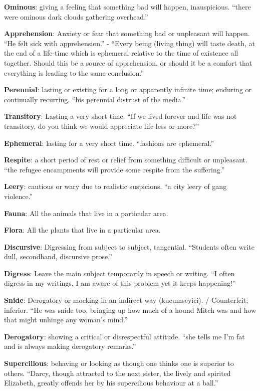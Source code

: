 \documentclass[12pt, a4paper]{ximera}
\begin{document}
\textbf{Ominous}: giving a feeling that something bad will happen, inauspicious. ``there were ominous dark clouds gathering overhead.''

\textbf{Apprehension}: Anxiety or fear that something bad or unpleasant will happen. ``He felt sick with apprehension.'' - ``Every being (living thing) will taste death, at the end of a life-time which is ephemeral relative to the time of existence all together. Should this be a source of apprehension, or should it be a comfort that everything is leading to the same conclusion.''

\textbf{Perennial}: lasting or existing for a long or apparently infinite time; enduring or continually recurring. ``his perennial distrust of the media.''

\textbf{Transitory}: Lasting a very short time. ``If we lived forever and life was not transitory, do you think we would appreciate life less or more?''

\textbf{Ephemeral}: lasting for a very short time. ``fashions are ephemeral.''

\textbf{Respite}: a short period of rest or relief from something difficult or unpleasant. ``the refugee encampments will provide some respite from the suffering.''

\textbf{Leery}: cautious or wary due to realistic suspicions. ``a city leery of gang violence.''

\textbf{Fauna}: All the animals that live in a particular area.

\textbf{Flora}: All the plants that live in a particular area.

\textbf{Discursive}: Digressing from subject to subject, tangential. ``Students often write dull, secondhand, discursive prose.''

\textbf{Digress}: Leave the main subject temporarily in speech or writing. ``I often digress in my writings, I am aware of this problem yet it keeps happening!''

\textbf{Snide}: Derogatory or mocking in an indirect way (kucumseyici). / Counterfeit; inferior. ``He was snide too, bringing up how much of a hound Mitch was and how that might unhinge any woman's mind.''

\textbf{Derogatory}: showing a critical or disrespectful attitude. ``she tells me I'm fat and is always making derogatory remarks.''

\textbf{Supercilious}: behaving or looking as though one thinks one is superior to others. ``Darcy, though attracted to the next sister, the lively and spirited Elizabeth, greatly offends her by his supercilious behaviour at a ball.''
\end{document}
